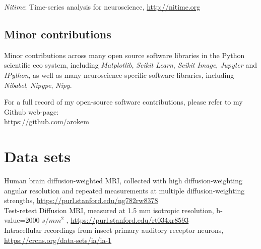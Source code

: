 \documentclass[11pt,fullpage]{article}
\newcommand{\years}[1]{\marginnote{\scriptsize #1}} %
\begin{document}
\years{2008 -- } \emph{Nitime}: Time-series analysis for neuroscience, \url{http://nitime.org}

\subsection*{Minor contributions}

Minor contributions across many open source software libraries in the Python
scientific eco system, including \emph{Matplotlib}, \emph{Scikit Learn},
\emph{Scikit Image}, \emph{Jupyter} and \emph{IPython}, as well as many neuroscience-specific software libraries, including \emph{Nibabel}, \emph{Nipype}, \emph{Nipy}.

For a full record of my open-source software contributions, please refer to my
Github web-page: \\ \url{https://github.com/arokem}

\section*{Data sets}
\years{2013} Human brain diffusion-weighted MRI, collected with high diffusion-weighting angular resolution and repeated measurements at multiple diffusion-weighting strengths, \url{https://purl.stanford.edu/ng782rw8378}\\
\years{2012} Test-retest Diffusion MRI, measured at 1.5 mm isotropic resolution, b-value=2000 $s/mm^2$ , \url{https://purl.stanford.edu/rt034xr8593}\\
\years{2005} Intracellular recordings from insect primary auditory receptor neurons, \url{https://crcns.org/data-sets/ia/ia-1}\\
\end{document}
